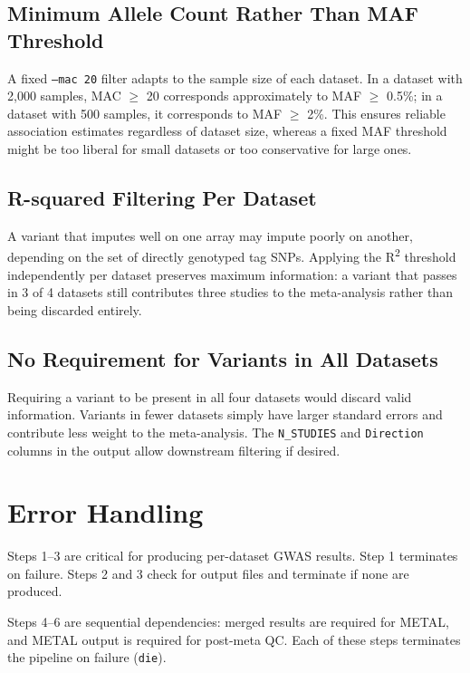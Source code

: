 \documentclass[11pt,letterpaper]{article}
\begin{document}
\subsection{Minimum Allele Count Rather Than MAF Threshold}

A fixed \texttt{--mac 20} filter adapts to the sample size of each dataset. In a dataset with 2,000 samples, MAC $\geq$ 20 corresponds approximately to MAF $\geq$ 0.5\%; in a dataset with 500 samples, it corresponds to MAF $\geq$ 2\%. This ensures reliable association estimates regardless of dataset size, whereas a fixed MAF threshold might be too liberal for small datasets or too conservative for large ones.

\subsection{R-squared Filtering Per Dataset}

A variant that imputes well on one array may impute poorly on another, depending on the set of directly genotyped tag SNPs. Applying the R\textsuperscript{2} threshold independently per dataset preserves maximum information: a variant that passes in 3 of 4 datasets still contributes three studies to the meta-analysis rather than being discarded entirely.

\subsection{No Requirement for Variants in All Datasets}

Requiring a variant to be present in all four datasets would discard valid information. Variants in fewer datasets simply have larger standard errors and contribute less weight to the meta-analysis. The \texttt{N\_STUDIES} and \texttt{Direction} columns in the output allow downstream filtering if desired.

\section{Error Handling}

Steps 1--3 are critical for producing per-dataset GWAS results. Step 1 terminates on failure. Steps 2 and 3 check for output files and terminate if none are produced.

Steps 4--6 are sequential dependencies: merged results are required for METAL, and METAL output is required for post-meta QC. Each of these steps terminates the pipeline on failure (\texttt{die}).
\end{document}
